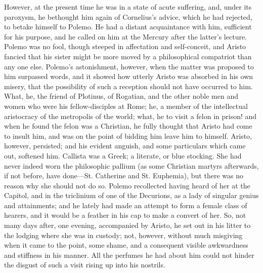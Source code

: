 However, at the present time he was in a state of acute suffering,
and, under its paroxysm, he bethought him again of Cornelius's
advice, which he had rejected, to betake himself to Polemo. He had a
distant acquaintance with him, sufficient for his purpose, and he
called on him at the Mercury after the latter's lecture. Polemo was no
fool, though steeped in affectation and self-conceit, and Aristo
fancied that his sister might be more moved by a philosophical
compatriot than any one else. Polemo's astonishment, however, when the
matter was proposed to him surpassed words, and it showed how utterly
Aristo was absorbed in his own misery, that the possibility of such a
reception should not have occurred to him. What, he, the friend of
Plotinus, of Rogatian, and the other noble men and women who were his
fellow-disciples at Rome; he, a member of the intellectual aristocracy
of the metropolis of the world; what, he to visit a felon in prison!
and when he found the felon was a Christian, he fully thought that
Aristo had come to insult him, and was on the point of bidding him
leave him to himself. Aristo, however, persisted; and his evident
anguish, and some particulars which came out, softened him. Callista
was a Greek; a literate, or blue stocking. She had never indeed worn
the philosophic pallium (as some Christian martyrs afterwards, if not
before, have done—St. Catherine and St. Euphemia), but there was no
reason why she should not do so. Polemo recollected having heard of
her at the Capitol, and in the triclinium of one of the Decurions, as
a lady of singular genius and attainments; and he lately had made an
attempt to form a female class of hearers, and it would be a
feather in his cap to make a convert of her. So, not many days after,
one evening, accompanied by Aristo, he set out in his litter to the
lodging where she was in custody; not, however, without much misgiving
when it came to the point, some shame, and a consequent visible
awkwardness and stiffness in his manner. All the perfumes he had about
him could not hinder the disgust of such a visit rising up into his
nostrils.

